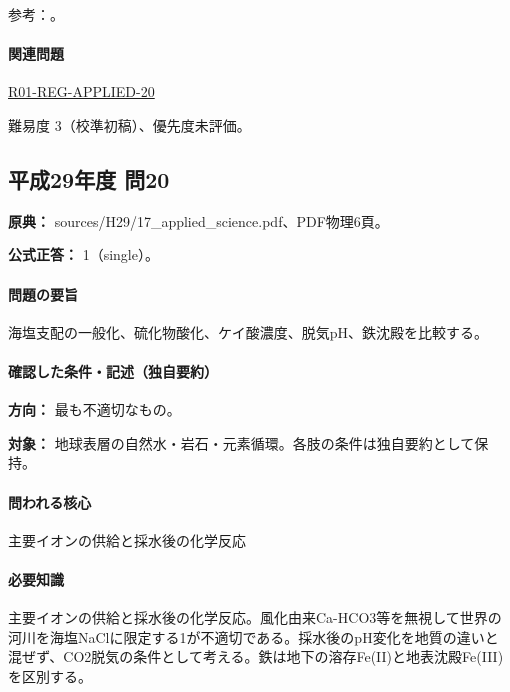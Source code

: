 \par 参考：\cite{gc_river1970,gc_hem,gc_diatom,gc_reverse}。

\paragraph{関連問題} \hyperref[q:r01-reg-applied-20]{R01-REG-APPLIED-20}

\par 難易度 3（校準初稿）、優先度未評価。

\subsection{平成29年度 問20}
\label{q:h29-reg-applied-20}

\noindent\textbf{原典：} sources/H29/17\_applied\_science.pdf、PDF物理6頁。

\textbf{公式正答：} 1（single）。

\paragraph{問題の要旨} 海塩支配の一般化、硫化物酸化、ケイ酸濃度、脱気pH、鉄沈殿を比較する。

\paragraph{確認した条件・記述（独自要約）}\mbox{}\par

\noindent\textbf{方向：} 最も不適切なもの。\par

\noindent\textbf{対象：} 地球表層の自然水・岩石・元素循環。各肢の条件は独自要約として保持。\par

\paragraph{問われる核心} 主要イオンの供給と採水後の化学反応

\paragraph{必要知識} 主要イオンの供給と採水後の化学反応。風化由来Ca-HCO3等を無視して世界の河川を海塩NaClに限定する1が不適切である。採水後のpH変化を地質の違いと混ぜず、CO2脱気の条件として考える。鉄は地下の溶存Fe(II)と地表沈殿Fe(III)を区別する。

